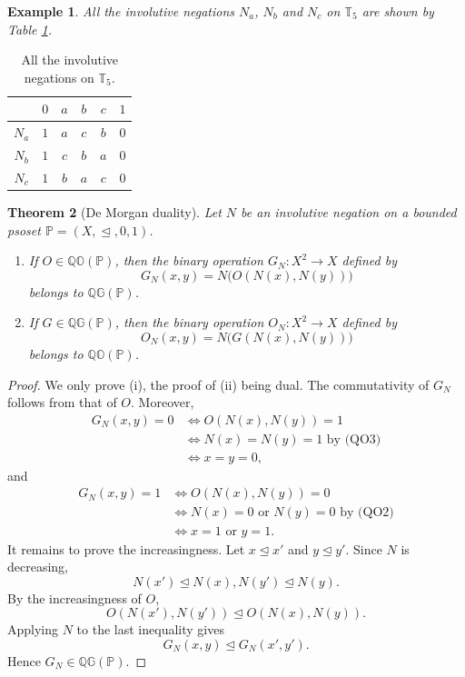 \documentclass[preprint,12pt]{elsarticle}
\newtheorem{theorem}{Theorem}[section]
\newtheorem{example}[theorem]{Example}
\begin{document}
\begin{example}\label{ex:negations}
\emph{All the involutive negations $N_a$, $N_b$ and $N_c$ on $\mathbb{T}_5$ are shown by Table \ref{tab:Oeta001}.}
\end{example}
\begin{table}[ht]
\centering
\caption{All the involutive negations on $\mathbb{T}_5$.}
\label{tab:Oeta001}
\begin{tabular}{c|ccccc}
&$0$&$a$&$b$&$c$&$1$\\\hline
$N_a$&$1$&$a$&$c$&$b$&$0$\\
$N_b$&$1$&$c$&$b$&$a$&$0$\\
$N_c$&$1$&$b$&$a$&$c$&$0$
\end{tabular}
\end{table}
\begin{theorem}[De Morgan duality]\label{thm:duality}
Let $N$ be an involutive negation on a bounded psoset $\mathbb{P}=(X,\trianglelefteq,0,1)$.
\begin{enumerate}[label=(\roman*)]
\item If $O\in\mathbb{QO}(\mathbb{P})$, then the binary operation $G_N:X^2\to X$ defined by
$$
 G_N(x,y)=N\bigl(O(N(x),N(y))\bigr)
$$
belongs to $\mathbb{QG}(\mathbb{P})$.
\item If $G\in\mathbb{QG}(\mathbb{P})$, then the binary operation $O_N:X^2\to X$ defined by
$$
 O_N(x,y)=N\bigl(G(N(x),N(y))\bigr)
$$
belongs to $\mathbb{QO}(\mathbb{P})$.
\end{enumerate}
\end{theorem}

\begin{proof}
We only prove (i), the proof of (ii) being dual. The commutativity of $G_N$ follows from that of $O$. Moreover,
$$
\begin{aligned}
G_N(x,y)=0
&\Longleftrightarrow O(N(x),N(y))=1\\
&\Longleftrightarrow N(x)=N(y)=1 \mbox{ by (QO3)}\\
&\Longleftrightarrow x=y=0,
\end{aligned}
$$
and
$$
\begin{aligned}
G_N(x,y)=1
&\Longleftrightarrow O(N(x),N(y))=0\\
&\Longleftrightarrow N(x)=0\mbox{ or }N(y)=0 \mbox{ by (QO2)}\\
&\Longleftrightarrow x=1\mbox{ or }y=1.
\end{aligned}
$$
It remains to prove the increasingness. Let $x\trianglelefteq x'$ and $y\trianglelefteq y'$. Since $N$ is decreasing,
$$
 N(x')\trianglelefteq N(x), N(y')\trianglelefteq N(y).
$$
By the increasingness of $O$,
$$
 O(N(x'),N(y'))\trianglelefteq O(N(x),N(y)).
$$
Applying $N$ to the last inequality gives
$$
 G_N(x,y)\trianglelefteq G_N(x',y').
$$
Hence $G_N\in\mathbb{QG}(\mathbb{P})$.
\end{proof}
\end{document}
